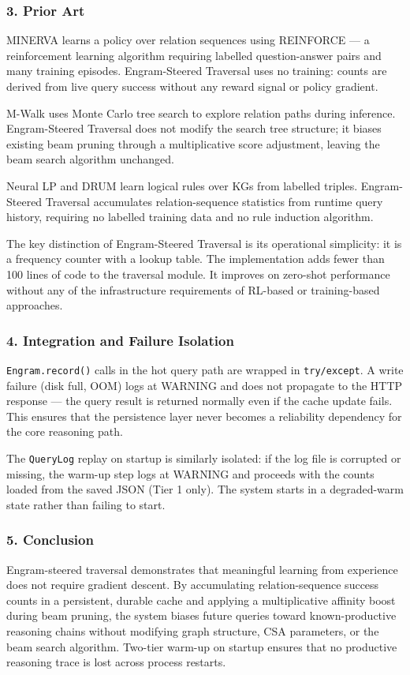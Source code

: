 \subsubsection{3. Prior Art}
MINERVA \cite{das2018minerva} learns a policy over relation sequences using REINFORCE — a reinf\-orcement learning algorithm requiring labelled question-answer pairs and many training episodes. Engram-Steered Traversal uses no training: counts are derived from live query success without any reward signal or policy gradient.

M-Walk uses Monte Carlo tree search to explore relation paths during inference. Engram-Steered Traversal does not modify the search tree structure; it biases existing beam pruning through a multi\-plicative score adjustment, leaving the beam search algorithm unchanged.

Neural LP and DRUM learn logical rules over KGs from labelled triples. Engram-Steered Traversal accumulates relation-sequence statistics from runtime query history, requiring no labelled training data and no rule induction algorithm.

The key distinction of Engram-Steered Traversal is its operational simplicity: it is a frequency counter with a lookup table. The imple\-mentation adds fewer than 100 lines of code to the traversal module. It improves on zero-shot performance without any of the infra\-structure requi\-rements of RL-based or training-based approaches.

\subsubsection{4. Integration and Failure Isolation}
\texttt{Engram.record()} calls in the hot query path are wrapped in \texttt{try/except}. A write failure (disk full, OOM) logs at WARNING and does not propagate to the HTTP response — the query result is returned normally even if the cache update fails. This ensures that the persistence layer never becomes a reliability dependency for the core reasoning path.

The \texttt{QueryLog} replay on startup is similarly isolated: if the log file is corrupted or missing, the warm-up step logs at WARNING and proceeds with the counts loaded from the saved JSON (Tier 1 only). The system starts in a degraded-warm state rather than failing to start.

\subsubsection{5. Conclusion}
Engram-steered traversal demon\-strates that meaningful learning from experience does not require gradient descent. By accum\-ulating relation-sequence success counts in a persistent, durable cache and applying a multi\-plicative affinity boost during beam pruning, the system biases future queries toward known-productive reasoning chains without modifying graph structure, CSA parameters, or the beam search algorithm. Two-tier warm-up on startup ensures that no productive reasoning trace is lost across process restarts.

